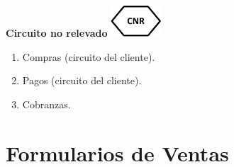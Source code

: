 \begin{center}
  \textbf{Circuito no relevado}
  \includegraphics{./Images/Simbolos/simbolo-CNR.png}
\end{center}
\begin{enumerate}
  \item Compras (circuito del cliente).
  \item Pagos (circuito del cliente).
  \item Cobranzas.
\end{enumerate}

\pagebreak
\section{Formularios de Ventas}

